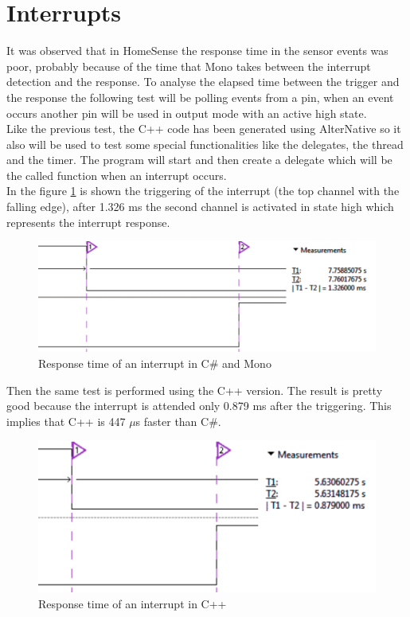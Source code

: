 \section{Interrupts}\label{S:Performance-Interruptions}
It was observed that in HomeSense the response time in the sensor events was poor, probably because of the time that Mono takes between the interrupt detection and the response. To analyse the elapsed time between the trigger and the response the following test will be polling events from a pin, when an event occurs another pin will be used in output mode with an active high state.
\\
Like the previous test, the C++ code has been generated using AlterNative so it also will be used to test some special functionalities like the delegates, the thread and the timer. The program will start and then create a delegate which will be the called function when an interrupt occurs.
\\
In the figure \ref{fig:interrupt-csharp} is shown the triggering of the interrupt (the top channel with the falling edge), after 1.326 ms the second channel is activated in state high which represents the interrupt response.
\begin{figure}[H]\begin{center}
 \centering
  \captionsetup{justification=centering}
  \includegraphics[scale=0.65]{pictures/performance-tests/Interruptions/csharp}
  \caption{Response time of an interrupt in C\# and Mono\label{fig:interrupt-csharp}}
\end{center}\end{figure}
Then the same test is performed using the C++ version. The result is pretty good because the interrupt is attended only 0.879 ms after the triggering. This implies that C++ is 447 $\mu$s faster than C\#.
\begin{figure}[H]\begin{center}
 \centering
  \captionsetup{justification=centering}
  \includegraphics[scale=0.65]{pictures/performance-tests/Interruptions/cxx}
  \caption{Response time of an interrupt in C++\label{fig:interrupt-cxx}}
\end{center}\end{figure}

